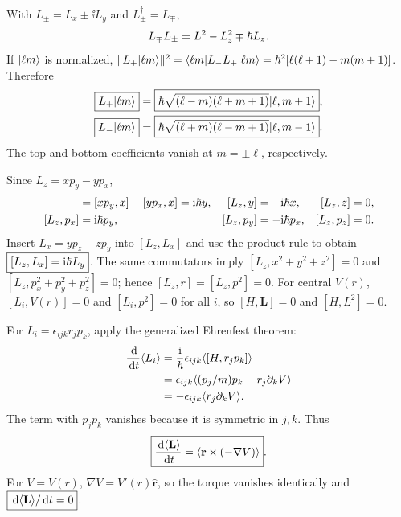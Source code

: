 With $L_\pm=L_x\pm\ii L_y$ and
$L_\pm^\dagger=L_\mp$,
\begin{equation}
L_\mp L_\pm=L^2-L_z^2\mp\hbar L_z.
\end{equation}
If $\lvert \ell m\rangle$ is normalized,
$\|L_+\lvert \ell m\rangle\|^2=
\langle \ell m\rvert L_-L_+\lvert \ell m\rangle
=\hbar^2[\ell(\ell+1)-m(m+1)]$.
Therefore
\begin{align}
\boxed{L_+\lvert \ell m\rangle}
&=\boxed{\hbar\sqrt{(\ell-m)(\ell+m+1)}
\lvert \ell,m+1\rangle},\\
\boxed{L_-\lvert \ell m\rangle}
&=\boxed{\hbar\sqrt{(\ell+m)(\ell-m+1)}
\lvert \ell,m-1\rangle}.
\end{align}
The top and bottom coefficients vanish at $m=\pm\ell$,
respectively.

Since $L_z=xp_y-yp_x$,
\begin{align}
[L_z,x]&=[xp_y,x]-[yp_x,x]=\ii\sh y,&
[L_z,y]&=-\ii\sh x,&[L_z,z]&=0,\\
[L_z,p_x]&=\ii\sh p_y,&
[L_z,p_y]&=-\ii\sh p_x,&[L_z,p_z]&=0.
\end{align}
Insert $L_x=yp_z-zp_y$ into
$[L_z,L_x]$ and use the product rule
to obtain $\boxed{[L_z,L_x]=\mathrm i\hbar L_y}$.
The same commutators imply
$[L_z,x^2+y^2+z^2]=0$ and
$[L_z,p_x^2+p_y^2+p_z^2]=0$;
hence
$\boxed{[L_z,r]=[L_z,p^2]=0}$.
For central $V(r)$, $[L_i,V(r)]=0$
and $[L_i,p^2]=0$ for all $i$,
so $\boxed{[H,\mathbf L]=0}$ and
$[H,L^2]=0$.

For $L_i=\epsilon_{ijk}r_jp_k$,
apply the generalized Ehrenfest theorem:
\begin{align}
\frac{\,\mathrm d}{\,\mathrm d t}\langle L_i\rangle
&=\frac{\mathrm i}{\hbar}
\epsilon_{ijk}\langle [H,r_jp_k]\rangle\\
&=\epsilon_{ijk}\langle (p_j/m)p_k
-r_j\partial_kV\rangle\\
&=-\epsilon_{ijk}\langle r_j\partial_kV\rangle.
\end{align}
The term with $p_jp_k$ vanishes
because it is symmetric in $j,k$.
Thus
\begin{equation}
\boxed{\frac{\,\mathrm d\langle \mathbf L\rangle}{\,\mathrm d t}
=\langle \mathbf r\times(-\nabla V)\rangle}.
\end{equation}
For $V=V(r)$, $\nabla V=V'(r)\hat{\mathbf r}$,
so the torque vanishes identically and
$\boxed{\,\mathrm d\langle \mathbf L\rangle/\,\mathrm d t=0}$.

